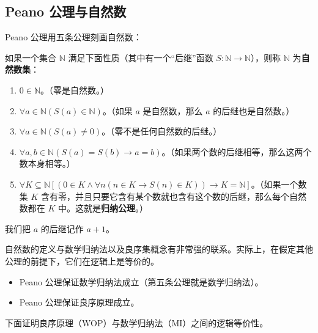 \subsection{Peano 公理与自然数}
Peano 公理用五条公理刻画自然数：
\begin{definition}[Peano 公理]
如果一个集合 $\mathbb{N}$ 满足下面性质（其中有一个“后继”函数 $S: \mathbb{N}\to \mathbb{N}$），则称 $\mathbb{N}$ 为\textbf{自然数集}：
\begin{enumerate}
    \item $0\in \mathbb{N}$。（零是自然数。）
    \item $\forall a\in \mathbb{N}(S(a)\in \mathbb{N})$。（如果 $a$ 是自然数，那么 $a$ 的后继也是自然数。）
    \item $\forall a\in \mathbb{N}(S(a)\ne 0)$。（零不是任何自然数的后继。）
    \item $\forall a,b\in \mathbb{N}(S(a)=S(b)\to a=b)$。（如果两个数的后继相等，那么这两个数本身相等。）
    \item $\forall K\subseteq \mathbb{N}[(0\in K\wedge \forall n(n\in K\to S(n)\in K))\to K=\mathbb{N}]$。（如果一个数集 $K$ 含有零，并且只要它含有某个数就也含有这个数的后继，那么每个自然数都在 $K$ 中。这就是\textbf{归纳公理}。）
\end{enumerate}
我们把 $a$ 的后继记作 $a+1$。
\end{definition}

自然数的定义与数学归纳法以及良序集概念有非常强的联系。实际上，在假定其他公理的前提下，它们在逻辑上是等价的。
\begin{itemize}
    \item Peano 公理保证数学归纳法成立（第五条公理就是数学归纳法）。
    \item Peano 公理保证良序原理成立。
\end{itemize}

下面证明良序原理（WOP）与数学归纳法（MI）之间的逻辑等价性。

